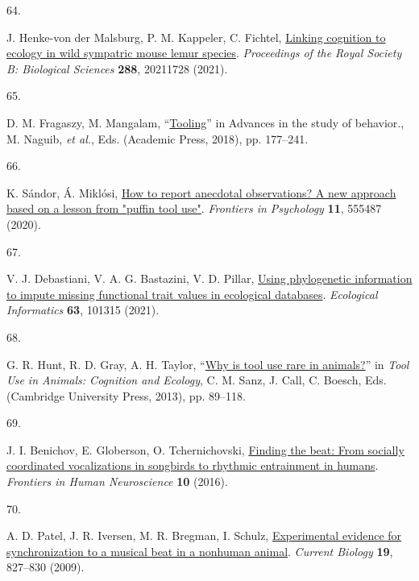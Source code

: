 \documentclass[
  man, donotrepeattitle,floatsintext]{apa6}
\newlength{\cslhangindent}
\newlength{\csllabelwidth}
\newlength{\cslentryspacingunit} %
\newenvironment{CSLReferences}[2] %
 {%
  \setlength{\parindent}{0pt}
  \ifodd #1
  \let\oldpar\par
  \def\par{\hangindent=\cslhangindent\oldpar}
  \fi
  \setlength{\parskip}{#2\cslentryspacingunit}
 }%
 {}
\newcommand{\CSLLeftMargin}[1]{\parbox[t]{\csllabelwidth}{#1}}
\newcommand{\CSLRightInline}[1]{\parbox[t]{\linewidth - \csllabelwidth}{#1}\break}
\begin{document}
\begin{CSLReferences}{0}{0}
\leavevmode{}%
\CSLLeftMargin{64. }%
\CSLRightInline{J. Henke-von der Malsburg, P. M. Kappeler, C. Fichtel, \href{https://doi.org/10.1098/rspb.2021.1728}{Linking cognition to ecology in wild sympatric mouse lemur species}. \emph{Proceedings of the Royal Society B: Biological Sciences} \textbf{288}, 20211728 (2021).}

\leavevmode{}%
\CSLLeftMargin{65. }%
\CSLRightInline{D. M. Fragaszy, M. Mangalam, {``\href{https://doi.org/10.1016/bs.asb.2018.01.001}{Tooling}''} in Advances in the study of behavior., M. Naguib, \emph{et al.}, Eds. (Academic Press, 2018), pp. 177--241.}

\leavevmode{}%
\CSLLeftMargin{66. }%
\CSLRightInline{K. Sándor, Á. Miklósi, \href{https://doi.org/10.3389/fpsyg.2020.555487}{How to report anecdotal observations? A new approach based on a lesson from "puffin tool use"}. \emph{Frontiers in Psychology} \textbf{11}, 555487 (2020).}

\leavevmode{}%
\CSLLeftMargin{67. }%
\CSLRightInline{V. J. Debastiani, V. A. G. Bastazini, V. D. Pillar, \href{https://doi.org/10.1016/j.ecoinf.2021.101315}{Using phylogenetic information to impute missing functional trait values in ecological databases}. \emph{Ecological Informatics} \textbf{63}, 101315 (2021).}

\leavevmode{}%
\CSLLeftMargin{68. }%
\CSLRightInline{G. R. Hunt, R. D. Gray, A. H. Taylor, {``\href{https://doi.org/10.1017/CBO9780511894800.007}{Why is tool use rare in animals?}''} in \emph{Tool Use in Animals: Cognition and Ecology}, C. M. Sanz, J. Call, C. Boesch, Eds. (Cambridge University Press, 2013), pp. 89--118.}

\leavevmode{}%
\CSLLeftMargin{69. }%
\CSLRightInline{J. I. Benichov, E. Globerson, O. Tchernichovski, \href{https://doi.org/10.3389/fnhum.2016.00255}{Finding the beat: From socially coordinated vocalizations in songbirds to rhythmic entrainment in humans}. \emph{Frontiers in Human Neuroscience} \textbf{10} (2016).}

\leavevmode{}%
\CSLLeftMargin{70. }%
\CSLRightInline{A. D. Patel, J. R. Iversen, M. R. Bregman, I. Schulz, \href{https://doi.org/10.1016/j.cub.2009.03.038}{Experimental evidence for synchronization to a musical beat in a nonhuman animal}. \emph{Current Biology} \textbf{19}, 827--830 (2009).}


\end{CSLReferences}
\end{document}
